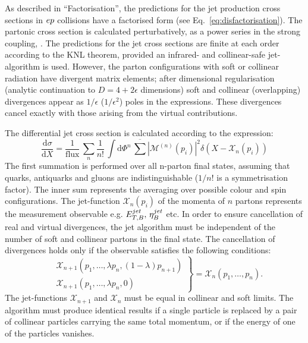As described in ``Factorisation'', the predictions for the jet production cross sections in $\mbox{$e p$}$ collisions have a factorised form (see Eq.~\eqref{eq:disfactorisation}). The partonic cross section is calculated perturbatively, as a power series in the strong coupling, \as. The predictions for the jet cross sections are finite at each order according to the KNL theorem\cite{Kinoshita:1962ur,Lee:1964is}, provided an infrared- and collinear-safe jet-algorithm is used. However, the parton configurations with soft or collinear radiation have divergent matrix elements; after dimensional regularisation (analytic continuation to $D=4+2\epsilon$ dimensions) soft and collinear (overlapping) divergences appear as $1/\epsilon$ ($1/\epsilon^2$) poles in the expressions. These divergences cancel exactly with those arising from the virtual contributions.

The differential jet cross section is calculated according to the expression:
\begin{equation}
\frac{\mathrm{d}\sigma}{\mathrm{d}X} = \frac{1}{\text{flux}}\, \sum_n{ \frac{1}{n!} \, \int{\mathrm{d}\Phi^{n}} \, \overline{\sum}{ \left| \mathcal{M}^{\left(n\right)}\left(p_i\right) \right|^2 } \delta\left( X - \mathcal{X}_n\left( p_i\right)\right)}
\label{eq:}
\end{equation}
The first summation is performed over all n-parton final states, assuming that quarks, antiquarks and gluons are indistinguishable ($1/n!$ is a symmetrisation factor). The inner sum represents the averaging over possible colour and spin configurations. The jet-function $\mathcal{X}_n\left( p_i\right)$ of the momenta of $n$ partons represents the measurement observable e.g. $\mbox{$E_{T,B}^{jet}$},\,\mbox{$\eta_B^{jet}$}$ etc. In order to ensure cancellation of real and virtual divergences, the jet algorithm must be independent of the number of soft and collinear partons in the final state. The cancellation of divergences holds only if the observable satisfies the following conditions:
\begin{equation}
\left.
\begin{aligned}
	&\mathcal{X}_{n+1}\left( p_1,\dots,\lambda p_n,\left(1-\lambda\right)p_{n+1}\right)\\
	&\mathcal{X}_{n+1}\left( p_1,\dots,\lambda p_n,0\right)
\end{aligned}
\right\} = \mathcal{X}_{n}\left( p_1,\dots, p_n\right).
\label{eq:}
\end{equation}
The jet-functions $\mathcal{X}_{n+1}$ and $\mathcal{X}_{n}$ must be equal in collinear and soft limits. The algorithm must produce identical results if a single particle is replaced by a pair of collinear particles carrying the same total momentum, or if the energy of one of the particles vanishes.

